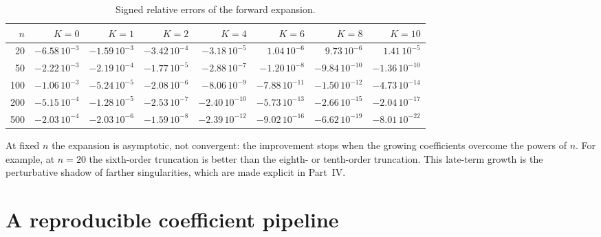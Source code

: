 \documentclass[11pt,a4paper,oneside,openany]{book}
\theoremstyle{definition}
\theoremstyle{remark}
\begin{document}
\begin{table}[htbp]
\centering
\caption{Signed relative errors of the forward expansion.}
\label{tab:forward-errors}
\begingroup
\scriptsize
\setlength{\tabcolsep}{3.1pt}
\begin{tabular}{r*{7}{r}}
\toprule
$n$ & $K=0$ & $K=1$ & $K=2$ & $K=4$ & $K=6$ & $K=8$ & $K=10$\\
\midrule
20  & $-6.58\,10^{-3}$ & $-1.59\,10^{-3}$ & $-3.42\,10^{-4}$ & $-3.18\,10^{-5}$ & $ 1.04\,10^{-6}$ & $ 9.73\,10^{-6}$ & $ 1.41\,10^{-5}$\\
50  & $-2.22\,10^{-3}$ & $-2.19\,10^{-4}$ & $-1.77\,10^{-5}$ & $-2.88\,10^{-7}$ & $-1.20\,10^{-8}$ & $-9.84\,10^{-10}$& $-1.36\,10^{-10}$\\
100 & $-1.06\,10^{-3}$ & $-5.24\,10^{-5}$ & $-2.08\,10^{-6}$ & $-8.06\,10^{-9}$ & $-7.88\,10^{-11}$& $-1.50\,10^{-12}$& $-4.73\,10^{-14}$\\
200 & $-5.15\,10^{-4}$ & $-1.28\,10^{-5}$ & $-2.53\,10^{-7}$ & $-2.40\,10^{-10}$& $-5.73\,10^{-13}$& $-2.66\,10^{-15}$& $-2.04\,10^{-17}$\\
500 & $-2.03\,10^{-4}$ & $-2.03\,10^{-6}$ & $-1.59\,10^{-8}$ & $-2.39\,10^{-12}$& $-9.02\,10^{-16}$& $-6.62\,10^{-19}$& $-8.01\,10^{-22}$\\
\bottomrule
\end{tabular}
\endgroup
\end{table}

At fixed $n$ the expansion is asymptotic, not convergent: the improvement stops
when the growing coefficients overcome the powers of $n$.  For example, at
$n=20$ the sixth-order truncation is better than the eighth- or tenth-order
truncation.  This late-term growth is the perturbative shadow of farther
singularities, which are made explicit in Part~IV.

\chapter{A reproducible coefficient pipeline}
\label{ch:algorithm}
\end{document}
